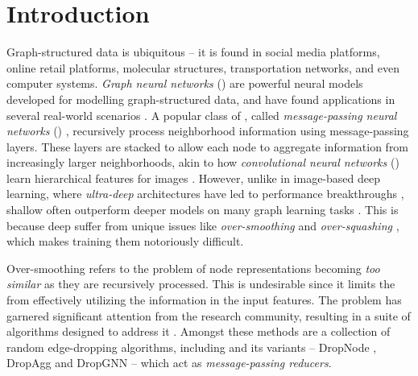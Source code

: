 \section{Introduction}

Graph-structured data is ubiquitous -- it is found in social media platforms, online retail platforms, molecular structures, transportation networks, and even computer systems. %
\textit{Graph neural networks} () \citep{scarselli_2009_gnns,li_2016_graph-seq-nns} are powerful neural models developed for modelling graph-structured data, and have found applications in several real-world scenarios \citep{gao2018large,you_2020_l2-gcn,you_2020_contrastive,you_2022_byov,pmlr-v119-you20a,ying_2018_gcnn-rcmd,zheng2022cold,NIPS2017_2eace51d,marinka_2017_multicellular,wale2006chemical}. %
A popular class of , called \textit{message-passing neural networks} () \citep{gilmer2017mpnn}, recursively process %
neighborhood information using message-passing layers. These layers are stacked to allow each node to aggregate information from increasingly larger neighborhoods, akin to how \textit{convolutional neural networks} () learn hierarchical features for images \citep{cnns_1989_lecun}. However, unlike in image-based deep learning, where \textit{ultra-deep}  architectures have led to performance breakthroughs \citep{szegedy_2015_deeper,he_2016_residual}, shallow  often outperform deeper models on many graph learning tasks \citep{zhou2021understanding}. This is because deep  suffer from unique issues like \textit{over-smoothing} \citep{oono2020graph} and \textit{over-squashing} \citep{alon2021on}, which makes training them notoriously difficult.

Over-smoothing refers to the problem of node representations becoming \textit{too similar} as they are recursively processed. This is undesirable since it limits the  from effectively utilizing the information in the input features. The problem has garnered significant attention from the research community, resulting in a suite of algorithms designed to address it \cite{rusch2023surveyoversmoothinggraphneural}. Amongst these methods are a collection of random edge-dropping algorithms, including  \citep{rong2020dropedge} and its variants -- DropNode \citep{feng2020dropnode}, DropAgg \cite{jiang2023dropagg} and DropGNN \citep{papp2021dropgnn} -- %
which act as \textit{message-passing reducers}. %

